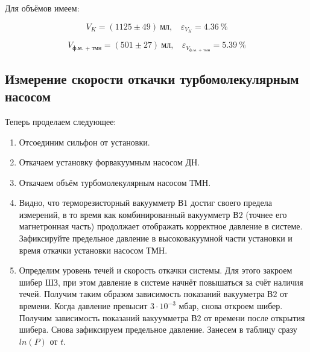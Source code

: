 \documentclass[a4paper, 12pt]{article} %
\begin{document}
Для объёмов имеем:

\begin{equation}
	V_{K} = (1125 \pm 49) \ \text{мл}, \ \text{ }
	\varepsilon_{V_{K}} = 4.36\ \%
\end{equation}

\begin{equation}
	V_{\text{ф.м. + тмн}} = (501 \pm 27) \ \text{мл}, \ \text{ }
	\varepsilon_{V_{\text{ф.м. + тмн}}} = 5.39 \ \%
\end{equation}

\subsection{Измерение скорости откачки турбомолекулярным насосом}

Теперь проделаем следующее:

\begin{enumerate}
	\item Отсоединим сильфон от установки.
	\item Откачаем установку форвакуумным насосом ДН.
	\item Откачаем объём турбомолекулярным насосом ТМН.
	\item Видно, что терморезисторный вакуумметр $В1$ достиг своего предела измерений, в то время как комбинированный вакуумметр $В2$ (точнее его магнетронная часть) продолжает отображать корректное давление в системе. Зафиксируйте предельное давление в высоковакуумной части установки и время откачки установки насосом ТМН.
	\item Определим уровень течей и скорость откачки системы. Для этого закроем шибер ШЗ, при этом давление в системе начнёт повышаться за счёт наличия течей. Получим таким образом зависимость показаний вакууметра $В2$ от времени. Когда давление превысит $3 \cdot 10^{-3}$ мбар,
снова откроем шибер. Получим зависимость показаний вакуумметра $В2$ от времени после открытия шибера. Снова зафиксируем предельное давление. Занесем в таблицу сразу $ln(P)$ от $t$.
\end{enumerate}
\end{document}
